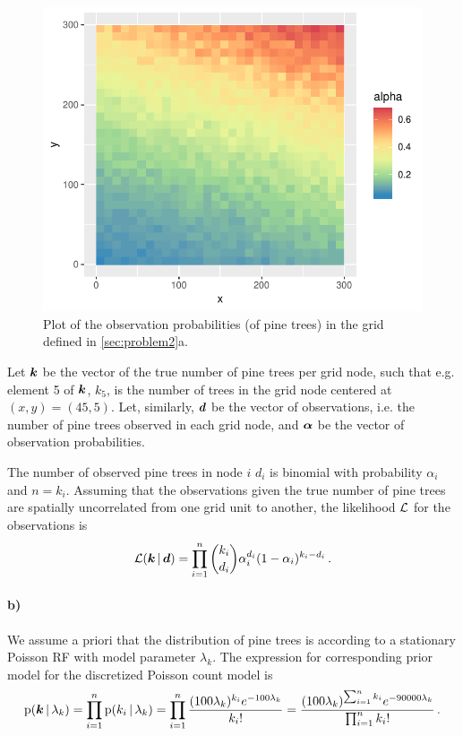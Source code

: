\begin{figure}
    \centering
    \includegraphics{figures/p2_alpha.pdf}
    \caption{Plot of the observation probabilities (of pine trees) in the grid defined in \ref{sec:problem2}a.}
    \label{fig:p2_alpha}
\end{figure}

Let $\bm{k}$ be the vector of the true number of pine trees per grid node, such that e.g. element 5 of $\bm{k}$, $k_5$, is the number of trees in the grid node centered at $(x, y) = (45, 5)$. Let, similarly, $\bm{d}$ be the vector of observations, i.e. the number of pine trees observed in each grid node, and $\bm{\alpha}$ be the vector of observation probabilities.

The number of observed pine trees in node $i$ $d_i$ is binomial with probability $\alpha_i$ and $n = k_i$. Assuming that the observations given the true number of pine trees are spatially uncorrelated from one grid unit to another, the likelihood $\mathcal{L}$ for the observations is
%
\begin{equation*}
    \mathcal{L}(\bm{k} \, | \, \bm{d}) = \prod_{i=1}^n \binom{k_i}{d_i} \alpha_i^{d_i} (1 - \alpha_i)^{k_i - d_i} \, .
\end{equation*}

\paragraph{b)}
We assume a priori that the distribution of pine trees is according to a stationary Poisson RF with model parameter $\lambda_k$. The expression for corresponding prior model for the discretized Poisson count model is
%
\begin{equation*}
    \mathrm{p}(\bm{k} \, | \, \lambda_k) = \prod_{i=1}^n \mathrm{p}(k_i \, | \, \lambda_k) = \prod_{i=1}^n \frac{(100\lambda_k)^{k_i} e^{-100\lambda_k}}{k_i!} = \frac{(100\lambda_k)^{\sum_{i=1}^n k_i} e^{-90000\lambda_k}}{\prod_{i=1}^n k_i!} \, .
\end{equation*}


